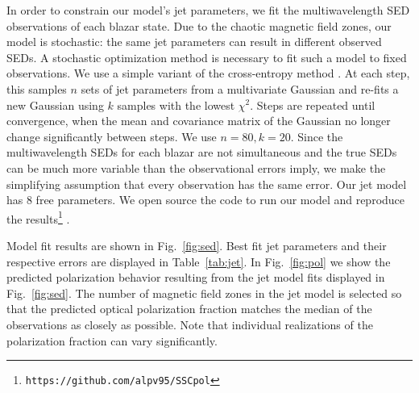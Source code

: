 In order to constrain our model's jet parameters, we fit the multiwavelength SED observations of each blazar state. Due to the chaotic magnetic field zones, our model is stochastic: the same jet parameters can result in different observed SEDs. A stochastic optimization method is necessary to fit such a model to fixed observations. We use a simple variant of the cross-entropy method \citep{rubinstein_cross_2004,kochenderfer_algorithms_2019}. At each step, this samples $n$ sets of jet parameters from a multivariate Gaussian and re-fits a new Gaussian using $k$ samples with the lowest $\chi^2$. Steps are repeated until convergence, when the mean and covariance matrix of the Gaussian no longer change significantly between steps. We use $n=80, k=20$. Since the multiwavelength SEDs for each blazar are not simultaneous and the true SEDs can be much more variable than the observational errors imply, we make the simplifying assumption that every observation has the same error. Our jet model has 8 free parameters. We open source the code to run our model and reproduce the results\footnote{\texttt{https://github.com/alpv95/SSCpol}} \citep{peirson_alpv95sscpol_2022}.

Model fit results are shown in Fig.~\ref{fig:sed}. Best fit jet parameters and their respective errors are displayed in Table~\ref{tab:jet}. In Fig.~\ref{fig:pol} we show the predicted polarization behavior resulting from the jet model fits displayed in Fig.~\ref{fig:sed}. The number of magnetic field zones in the jet model is selected so that the predicted optical polarization fraction matches the median of the observations \citep{blinov_robopol_2021} as closely as possible. Note that individual realizations of the polarization fraction can vary significantly.

